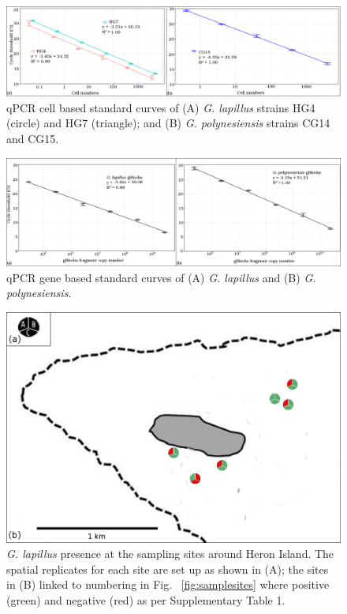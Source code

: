 \documentclass[12pt]{article}
\begin{document}
\begin{figure}
\includegraphics[scale=.4]{Hero_qpcr-figs/Fig2_cell-based-stds-merged.png}
\caption{qPCR cell based standard curves of (A) \emph{G. lapillus} strains HG4 (circle) and HG7 (triangle); and (B) \emph{G. polynesiensis} strains CG14 and CG15.} %
\label{fig:stdCurve}
\end{figure}
\FloatBarrier

\begin{figure}
\includegraphics[scale=.4]{Hero_qpcr-figs/Fig3_gblocks-standards.png}
\caption{qPCR gene based standard curves of (A) \emph{G. lapillus} and (B) \emph{G. polynesiensis}.} %
\label{fig:lapigblocks}
\end{figure}
\FloatBarrier

\FloatBarrier 
\begin{figure} 
\includegraphics[scale=2]{Hero_qpcr-figs/Fig4_Heron-positive-negative-samplingsites_May18.png} 
\caption{\emph{G. lapillus} presence at the sampling sites around Heron Island. The spatial replicates for each site are set up as shown in (A); the sites in (B) linked to numbering in Fig. ~\ref{fig:samplesites} where positive (green) and negative (red) as per Supplementary Table 1.} 
\label{fig:envposneg}
\end{figure} 
\FloatBarrier
\end{document}
